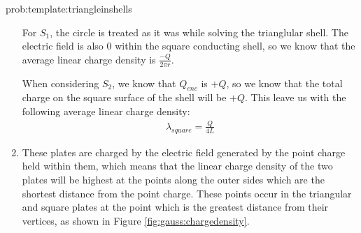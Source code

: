 \begin{solution}{prob:template:triangleinshells}
\begin{enumerate}
		
	For $S_1$, the circle is treated as it was while solving the trianglular shell. The electric field is also $0$ within the square conducting shell, so we know that the average linear charge density is $\frac{-Q}{2\pi r}$.
	
	When considering $S_2$, we know that $Q_{enc}$ is $+Q$, so we know that the total charge on the square surface of the shell will be $+Q$. This leave us with the following average linear charge density:
	\begin{align*}
		\lambda_{square} = \frac{Q}{4L}
	\end{align*}	
	
	\item These plates are charged by the electric field generated by the point charge held within them, which means that the linear charge density of the two plates will be highest at the points along the outer sides which are the shortest distance from the point charge. These points occur in the triangular and square plates at the point which is the greatest distance from their vertices, as shown in Figure \ref{fig:gauss:chargedensity}.
	
	
	\end{enumerate}
\end{solution}
